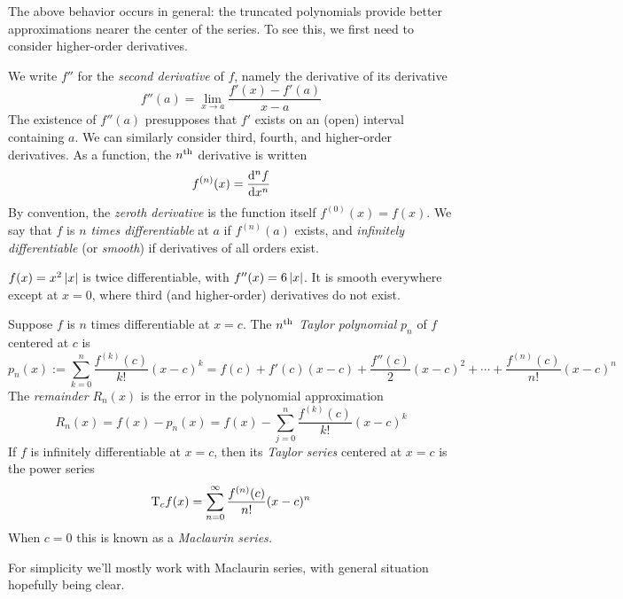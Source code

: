 The above behavior occurs in general: the truncated polynomials provide better approximations nearer the center of the series. To see this, we first need to consider higher-order derivatives.

\begin{defn}{}{}
	We write $f''$ for the \emph{second derivative} of $f$, namely the derivative of its derivative
	\[
		f''(a)=\lim_{x\to a}\frac{f'(x)-f'(a)}{x-a}
	\]
	The existence of $f''(a)$ presupposes that $f'$ exists on an (open) interval containing $a$. We can similarly consider third, fourth, and higher-order derivatives. As a function, the $n\th$ derivative is written
	\[
		f^{(n)}(x)=\diff[^nf]{x^n}
	\]
	By convention, the \emph{zeroth derivative} is the function itself $f^{(0)}(x)=f(x)$. We say that $f$ is \emph{$n$ times differentiable} at $a$ if $f^{(n)}(a)$ exists, and \emph{infinitely differentiable} (or \emph{smooth}) if derivatives of all orders exist.
\end{defn}

\begin{example}{}{}
	$f(x)=x^2\nm x$ is twice differentiable, with $f''(x)=6\nm x$. It is smooth everywhere except at $x=0$, where third (and higher-order) derivatives do not exist.
\end{example}


\goodbreak


\begin{defn}{}{}
	Suppose $f$ is $n$ times differentiable at $x=c$. The \emph{$n\th$ Taylor polynomial} $p_n$ of $f$ centered at $c$ is
	\[
		p_n(x):=\sum_{k=0}^n\frac{f^{(k)}(c)}{k!}(x-c)^k 
		=f(c)+f'(c)(x-c)+\frac{f''(c)}2(x-c)^2+\cdots+\frac{f^{(n)}(c)}{n!}(x-c)^n
	\]
	The \emph{remainder} $R_n(x)$ is the error in the polynomial approximation
	\[
		R_n(x)=f(x)-p_n(x)
		=f(x)-\sum_{j=0}^{n}\frac{f^{(k)}(c)}{k!}(x-c)^k
	\]
	If $f$ is infinitely differentiable at $x=c$, then its \emph{Taylor series} centered at $x=c$ is the power series
	\[
		\rT_c f(x) =\sum_{n=0}^\infty\frac{f^{(n)}(c)}{n!}(x-c)^n
	\]
	When $c=0$ this is known as a \emph{Maclaurin series.}\footnotemark
\end{defn}


For simplicity we'll mostly work with Maclaurin series, with general situation hopefully being clear.

